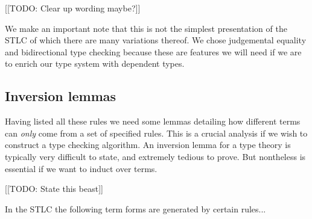 [[TODO: Clear up wording maybe?]]
\begin{remark}
    We make an important note that this is not the simplest presentation of the STLC of which there are many variations thereof. We chose judgemental equality and bidirectional type checking because these are features we will need if we are to enrich our type system with dependent types.
\end{remark}

\subsection{Inversion lemmas}
Having listed all these rules we need some lemmas detailing how different terms can \emph{only} come from a set of specified rules. This is a crucial analysis if we wish to construct a type checking algorithm. An inversion lemma for a type theory is typically very difficult to state, and extremely tedious to prove. But nontheless is essential if we want to induct over terms.

[[TODO: State this beast]]
\begin{lemma}
    In the STLC the following term forms are generated by certain rules...
\end{lemma}

